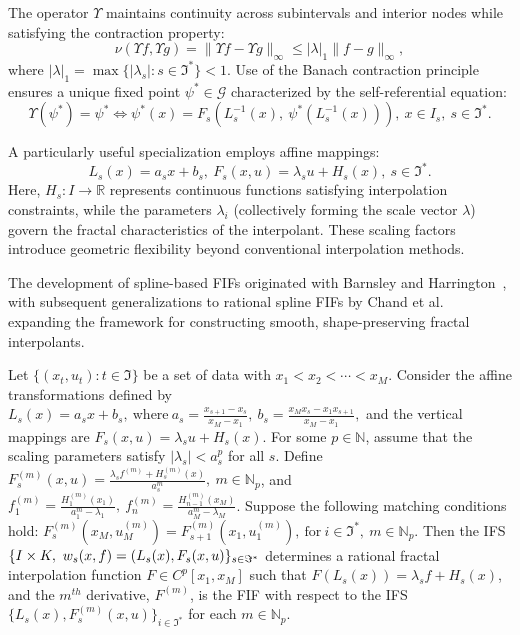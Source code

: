 \documentclass[runningheads]{llncs}
\begin{document}
	The operator $ \Upsilon $ maintains continuity across subintervals and interior nodes while satisfying the contraction property:
	\begin{equation}
		\label{eq:contraction}
		\nu(\Upsilon f, \Upsilon g) = \|\Upsilon f - \Upsilon g\|_\infty \leq |\lambda|_1 \|f - g\|_\infty,
	\end{equation}
	where $ |\lambda|_1 = \max\{|\lambda_s| : s \in \Im^*\} < 1 $. Use of the Banach contraction principle ensures a unique fixed point $ \psi^* \in \mathcal{G} $ characterized by the self-referential equation:
	$$ \Upsilon(\psi^*) = \psi^* \Leftrightarrow \psi^*(x) = F_s\left(L_s^{-1}(x),\ \psi^*\left(L_s^{-1}(x)\right)\right), \ x \in I_s,\ s \in \Im^*. $$
	
	A particularly useful specialization employs affine mappings:
	\begin{equation}
		\label{eq:affine_fif}
		L_s(x) = a_s x + b_s, \ F_s(x, u) = \lambda_s u + H_s(x), \ s \in \Im^*.
	\end{equation}
	Here, $ H_s : I \to \mathbb{R} $ represents continuous functions satisfying interpolation constraints, while the parameters $ \lambda_i $ (collectively forming the scale vector $ \lambda $) govern the fractal characteristics of the interpolant. These scaling factors introduce geometric flexibility beyond conventional interpolation methods.
	
	The development of spline-based FIFs originated with Barnsley and Harrington~\cite{BarHar89}, with subsequent generalizations to rational spline FIFs by Chand et al.~\cite{VC2014} expanding the framework for constructing smooth, shape-preserving fractal interpolants.
	
	\begin{theorem}\label{theorem1}
		Let $\{(x_t, u_t) : t \in \Im\}$ be a set of data with $x_1 < x_2 < \cdots < x_M$. Consider the affine transformations defined by $ L_s(x) = a_s x + b_s, \ \text{where} \ a_s = \frac{x_{s+1} - x_s}{x_M - x_1}, \ b_s = \frac{x_M x_s - x_1 x_{s+1}}{x_M - x_1}, $ and the vertical mappings are $ F_s(x, u) = \lambda_s u + H_s(x)$. For some $p \in \mathbb{N}$, assume that the scaling parameters satisfy $|\lambda_s| < a_s^p$ for all $s$. Define $ F_s^{(m)}(x, u) = \frac{\lambda_s f^{(m)} + H_s^{(m)}(x)}{a_s^m}, \ m \in \mathbb{N}_p$, and $ f_1^{(m)} = \frac{H_1^{(m)}(x_1)}{a_1^m - \lambda_1}, \ f_n^{(m)} = \frac{H_{n-1}^{(m)}(x_M)}{a_M^m - \lambda_M}$. Suppose the following matching conditions hold:
		$ F_s^{(m)}(x_M, u_M^{(m)}) = F_{s+1}^{(m)}(x_1, u_1^{(m)}), \ \text{for}\ i \in \Im^*,\ m \in \mathbb{N}_p$.  Then the IFS $\{I \times K,\ w_s(x, f) = (L_s(x),\\ F_s(x, u)\}_{s \in \Im^*}$ determines a rational fractal interpolation function $F \in C^p[x_1, x_M]$ such that $ F(L_s(x)) = \lambda_s f + H_s(x)$, and the $m^{th}$ derivative, $F^{(m)}$, is the FIF with respect to the IFS $\{L_s(x), F_s^{(m)}(x, u)\}_{i\in \Im^*}$ for each $m \in \mathbb{N}_p$.
	\end{theorem}
	
\end{document}
